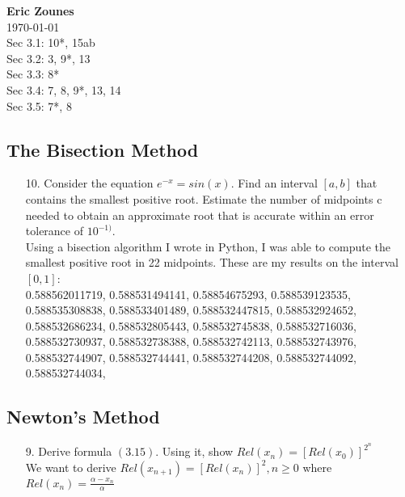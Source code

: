 \documentclass[12pt,letterpaper]{article}
\begin{document}
\begin{flushright}
\end{flushright}
\begin{flushleft}
\textbf{Eric Zounes} \\
\today \\ 
Sec 3.1: 10*, 15ab \\
Sec 3.2: 3, 9*, 13 \\
Sec 3.3: 8* \\
Sec 3.4: 7, 8, 9*, 13, 14 \\
Sec 3.5: 7*, 8 \\
\end{flushleft}
\subsection{The Bisection Method} 
	\begin{enumerate} 
		\item[10.] Consider the equation $e^{-x} = sin(x)$. Find an interval $[a,b]$ that contains the smallest positive root. Estimate the number of midpoints c needed to obtain an approximate root that is accurate within an error tolerance of $10^{-1)}$. \\
	Using a bisection algorithm I wrote in Python, I was able to compute the smallest positive root in 22 midpoints. These are my results on the interval $[0,1]$: \\
0.588562011719,
0.588531494141,
0.58854675293, 
0.588539123535,
0.588535308838,
0.588533401489,
0.588532447815,
0.588532924652,
0.588532686234,
0.588532805443,
0.588532745838,
0.588532716036,
0.588532730937,
0.588532738388,
0.588532742113,
0.588532743976,
0.588532744907,
0.588532744441,
0.588532744208,
0.588532744092,
0.588532744034,
	\end{enumerate} 
\subsection{Newton's Method}
	\begin{enumerate} 
		\item[9.] Derive formula $(3.15)$. Using it, show $Rel(x_{n}) = [Rel(x_{0})]^{2^{n}}$ \\
			We want to derive $Rel(x_{n+1}) = [Rel(x_{n})]^{2}, n \geq 0$ where \\
			$Rel(x_{n}) = \frac{\alpha - x_{n}}{\alpha}$ \\   
			
	\end{enumerate} 
			
\end{document}
